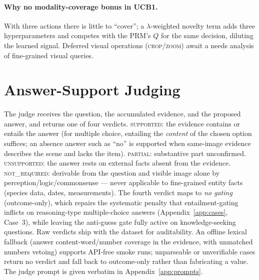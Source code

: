 \documentclass[letterpaper,twocolumn,10pt]{article}
\begin{document}
\paragraph{Why no modality-coverage bonus in UCB1.}
With three actions there is little to ``cover''; a $\lambda$-weighted
novelty term adds three hyperparameters and competes with the PRM's $Q$
for the same decision, diluting the learned signal. Deferred visual
operations (\textsc{crop}/\textsc{zoom}) await a needs analysis of
fine-grained visual queries.

\section{Answer-Support Judging}
\label{app:support}
The judge receives the question, the accumulated evidence, and the proposed
answer, and returns one of four verdicts. \textsc{supported}: the evidence
contains or entails the answer (for multiple choice, entailing the
\emph{content} of the chosen option suffices; an absence answer such as
``no'' is supported when same-image evidence describes the scene and lacks
the item). \textsc{partial}: substantive part unconfirmed.
\textsc{unsupported}: the answer rests on external facts absent from the
evidence. \textsc{not\_required}: derivable from the question and visible
image alone by perception/logic/commonsense --- never applicable to
fine-grained entity facts (species data, dates, measurements). The fourth
verdict maps to \emph{no gating} (outcome-only), which repairs the
systematic penalty that entailment-gating inflicts on reasoning-type
multiple-choice answers (Appendix~\ref{app:cases}, Case~3), while leaving
the anti-guess gate fully active on knowledge-seeking questions. Raw
verdicts ship with the dataset for auditability. An offline lexical
fallback (answer content-word/number coverage in the evidence, with
unmatched numbers vetoing) supports API-free smoke runs; unparseable or
unverifiable cases return no verdict and fall back to outcome-only rather
than fabricating a value. The judge prompt is given verbatim in
Appendix~\ref{app:prompts}.
\end{document}
